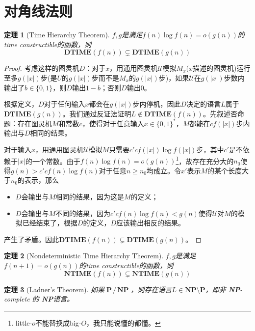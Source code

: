 \documentclass[8pt]{article}
\theoremstyle{compact}
\newtheorem{theorem}{定理}
\def\ge{\geqslant}
\def\DTIME{\textbf{DTIME}}
\def\NTIME{\textbf{NTIME}}
\def\P{\textbf{P}}
\def\NP{\textbf{NP}}
\begin{document}
\newpage
\section{对角线法则}
\begin{theorem}[Time Hierarchy Theorem]
	$f, g$是满足$f(n) \log f(n) = o(g(n))$的time constructible的函数，则
	$$\DTIME(f(n)) \subsetneq \DTIME(g(n))$$
	\label{time_hierarchy_thm}
\end{theorem}
\begin{proof}
	考虑这样的图灵机$D$：对于$x$，用通用图灵机$\mathcal{U}$模拟$M_x$($x$描述的图灵机)运行至多$g(|x|)$步(是$U$的$g(|x|)$步而不是$M_x$的$g(|x|)$步)，如果$\mathcal{U}$在$g(|x|)$步数内输出了$b \in \{0, 1\}$，则$D$输出$1-b$；否则$D$输出$0$。

	根据定义，$D$对于任何输入$x$都会在$g(|x|)$步内停机，因此$D$决定的语言$L$属于$\DTIME(g(n))$。我们通过反证法证明$L \notin \DTIME(f(n))$。先叙述否命题：存在图灵机$M$和常数$c$，使得对于任意输入$x \in \{0, 1\}^*$，$M$都能在$cf(|x|)$步内输出与$D$相同的结果。

	对于输入$x$，用通用图灵机$\mathcal{U}$模拟$M$只需要$c'cf(|x|)\log f(|x|)$步，其中$c'$是不依赖于$|x|$的一个常数。由于$f(n) \log f(n) = o(g(n))$\footnote{little-$o$不能替换成big-$O$，我只能说懂的都懂。}，故存在充分大的$n_0$使得$g(n) > c'cf(n) \log f(n)$对于任意$n \ge n_0$均成立。令$x'$表示$M$的某个长度大于$n_0$的表示，那么
	\begin{itemize}
		\item $D$会输出与$M$相同的结果，因为这是$M$的定义；
		\item $D$会输出与$M$不同的结果，因为$c'cf(n)\log f(n) < g(n)$使得$\mathcal U$对$M$的模拟已经结束了，根据$D$的定义，$D$应该输出相反的结果。
	\end{itemize}

	产生了矛盾。因此$\DTIME(f(n)) \subsetneq \DTIME(g(n))$。
\end{proof}
\begin{theorem}[Nondeterministic Time Hierarchy Theorem]
	$f, g$是满足$f(n + 1) = o(g(n))$的time constructible的函数，则
	$$\NTIME(f(n)) \subsetneq \NTIME(g(n))$$
\end{theorem}
\begin{theorem}[Ladner's Theorem]
	如果$\P \neq \NP$，则存在语言$L \in \NP \setminus \P$，即非 \NP-complete 的 \NP 语言。
\end{theorem}

\newpage
\end{document}
